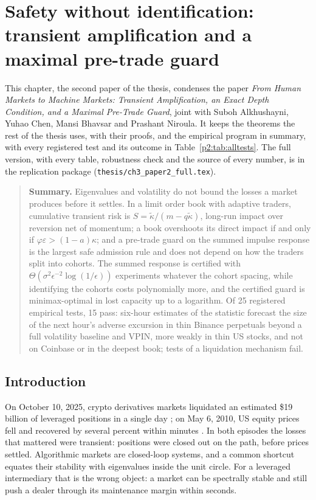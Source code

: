 \chapter{Safety without identification: transient amplification and a maximal pre-trade guard}\label{ch:p2}

    This chapter, the second paper of the thesis, condenses the paper \emph{From Human Markets to Machine Markets: Transient Amplification, an Exact Depth Condition, and a Maximal Pre-Trade Guard}, joint with Suboh Alkhushayni, Yuhao Chen, Mansi Bhavsar and Prashant Niroula. It keeps the theorems the rest of the thesis uses, with their proofs, and the empirical program in summary, with every registered test and its outcome in Table~\ref{p2:tab:alltests}. The full version, with every table, robustness check and the source of every number, is in the replication package (\texttt{thesis/ch3\_paper2\_full.tex}).

    \begin{quote}\small\textbf{Summary.} Eigenvalues and volatility do not bound the losses a market produces before it settles. In a limit order book with adaptive traders, cumulative transient risk is $S=\tilde\kappa/(m-q\tilde\kappa)$, long-run impact over reversion net of momentum; a book overshoots its direct impact if and only if $\varphi\varepsilon>(1-a)\kappa$; and a pre-trade guard on the summed impulse response is the largest safe admission rule and does not depend on how the traders split into cohorts. The summed response is certified with $\Theta(\sigma^2\epsilon^{-2}\log(1/\epsilon))$ experiments whatever the cohort spacing, while identifying the cohorts costs polynomially more, and the certified guard is minimax-optimal in lost capacity up to a logarithm. Of 25 registered empirical tests, 15 pass: six-hour estimates of the statistic forecast the size of the next hour's adverse excursion in thin Binance perpetuals beyond a full volatility baseline and VPIN, more weakly in thin US stocks, and not on Coinbase or in the deepest book; tests of a liquidation mechanism fail.\end{quote}

    \section{Introduction}

    On October 10, 2025, crypto derivatives markets liquidated an estimated \$19 billion of leveraged positions in a single day \citep{p2:shares2025}; on May 6, 2010, US equity prices fell and recovered by several percent within minutes \citep{p2:kirilenko2017}. In both episodes the losses that mattered were transient: positions were closed out on the path, before prices settled. Algorithmic markets are closed-loop systems, and a common shortcut equates their stability with eigenvalues inside the unit circle. For a leveraged intermediary that is the wrong object: a market can be spectrally stable and still push a dealer through its maintenance margin within seconds.

